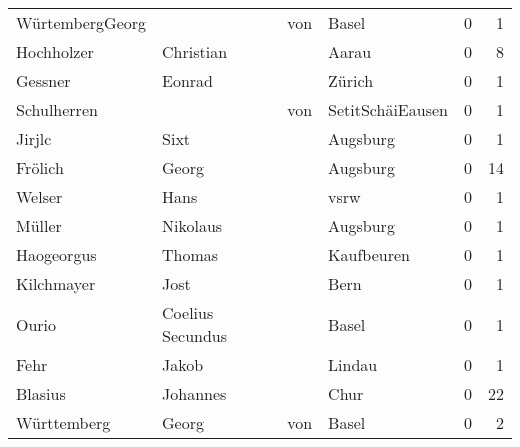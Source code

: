 \begin{tabular}{llllrr}
          WürtembergGeorg &                                    &         von &                                       Basel &          0 &         1 \\
               Hochholzer &                          Christian &             &                                       Aarau &          0 &         8 \\
                  Gessner &                             Eonrad &             &                                      Zürich &          0 &         1 \\
              Schulherren &                                    &         von &                            SetitSchäiEausen &          0 &         1 \\
                   Jirjlc &                               Sixt &             &                                    Augsburg &          0 &         1 \\
                  Frölich &                              Georg &             &                                    Augsburg &          0 &        14 \\
                   Welser &                               Hans &             &                                        vsrw &          0 &         1 \\
                   Müller &                           Nikolaus &             &                                    Augsburg &          0 &         1 \\
               Haogeorgus &                             Thomas &             &                                  Kaufbeuren &          0 &         1 \\
               Kilchmayer &                               Jost &             &                                        Bern &          0 &         1 \\
                    Ourio &                   Coelius Secundus &             &                                       Basel &          0 &         1 \\
                     Fehr &                              Jakob &             &                                      Lindau &          0 &         1 \\
                  Blasius &                           Johannes &             &                                        Chur &          0 &        22 \\
              Württemberg &                              Georg &         von &                                       Basel &          0 &         2 \\

\end{tabular}
